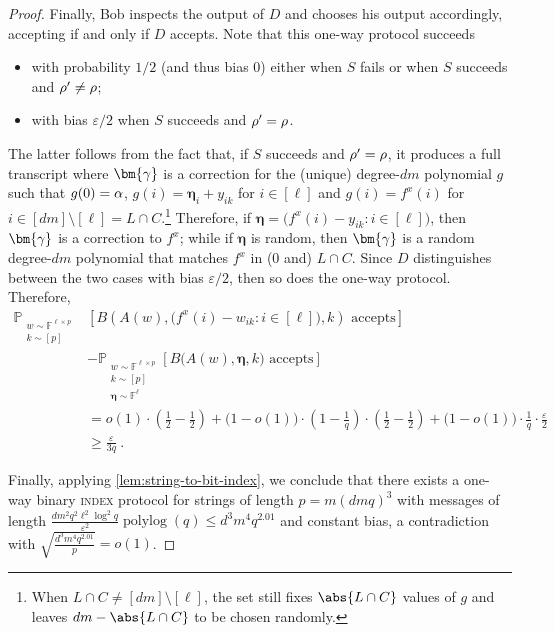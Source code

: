 \documentclass[10pt,a4paper]{article}
\theoremstyle{definition}
\newcommand{\field}{\mathbb{F}}
\renewcommand{\P}{\mathbb P}
\newcommand{\polylog}{\operatorname{polylog}}
\newcommand{\eps}{\varepsilon}
\newcommand{\indexproblem}{\normalfont\textsc{index}\xspace}
\newcommand{\pcommitlength}{p}
\newcommand{\pcommitstring}{y}
\newcommand{\dimension}{m}
\newcommand{\degree}{d}
\newcommand{\fieldsize}{q}
\renewcommand{\line}{L}
\def\fe#1{
    \ifnum#1=1
        \alpha
    \else
    \ifnum#1=2
        \beta
    \else
    \ifnum#1=3
        \gamma
    \fi\fi\fi
}
\def\rfe#1{
    \ifnum#1=1
        \rho
    \else
    \ifnum#1=2
        \sigma
    \else
    \fi\fi
}
\begin{document}
\begin{proof}
    Finally, Bob inspects the output of $D$ and chooses his output accordingly, accepting if and only if $D$ accepts. Note that this one-way protocol succeeds
    \begin{itemize}[noitemsep]
        \item with probability $1/2$ (and thus bias $0$) either when $S$ fails or when $S$ succeeds and $\rfe1' \neq \rfe1$;
        \item with bias $\eps/2$ when $S$ succeeds and $\rfe1' = \rfe1$.
    \end{itemize}
    
    The latter follows from the fact that, if $S$ succeeds and $\rfe1' = \rfe1$, it produces a full transcript where $\bm{\fe3}$ is a correction for the (unique) degree-$\degree\dimension$ polynomial $g$ such that $g(0) = \fe1$, $g(i) = \bm{\eta}_i + \pcommitstring_{ik}$ for $i \in [\ell]$ and $g(i) = f^x(i)$ for $i \in [\degree\dimension] \setminus [\ell] = \line \cap C$.\footnote{When $\line \cap C \neq [\degree\dimension] \setminus [\ell]$, the set still fixes $\abs{\line \cap C}$ values of $g$ and leaves $\degree\dimension - \abs{\line \cap C}$ to be chosen randomly.} Therefore, if $\bm{\eta} = \big(f^x(i) - \pcommitstring_{ik} : i \in [\ell]\big)$, then $\bm{\fe3}$ is a correction to $f^x$; while if $\bm{\eta}$ is random, then $\bm{\fe3}$ is a random degree-$\degree\dimension$ polynomial that matches $f^x$ in ($0$ and) $\line \cap C$. Since $D$ distinguishes between the two cases with bias $\eps/2$, then so does the one-way protocol. Therefore,
    \begin{align*}
        \P_{\substack{w \sim \field^{\ell \times \pcommitlength}\\k \sim [\pcommitlength]}}&\left[B\left(A(w), \big(f^x(i) - w_{ik} : i \in [\ell]\big), k\right)\text{ accepts}\right]\\
        &- \P_{\substack{w \sim \field^{\ell \times \pcommitlength}\\k \sim [\pcommitlength]\\\bm{\eta} \sim \field^\ell}}\left[B\big(A(w), \bm{\eta}, k\big)\text{ accepts}\right]\\
        &= o(1) \cdot \left(\frac12 - \frac12\right) + \big(1 - o(1)\big) \cdot \left(1 - \frac1 \fieldsize\right) \cdot \left(\frac12 - \frac12\right) + \big(1 - o(1)\big) \cdot \frac1 \fieldsize \cdot \frac{\eps}{2}\\
        &\geq \frac{\eps}{3\fieldsize}~.
    \end{align*}
    
    Finally, applying \cref{lem:string-to-bit-index}, we conclude that there exists a one-way binary \indexproblem protocol for strings of length $\pcommitlength = \dimension(\degree \dimension \fieldsize)^3$ with messages of length $\frac{\degree\dimension^2 \fieldsize^2 \ell^2 \log^2 \fieldsize}{\eps^2} \polylog(\fieldsize) \leq \degree^3\dimension^4\fieldsize^{2.01}$ and constant bias, a contradiction with $\sqrt{\frac{\degree^3 \dimension^4 \fieldsize^{2.01}}{\pcommitlength}} = o(1)$.
\end{proof}
\end{document}
